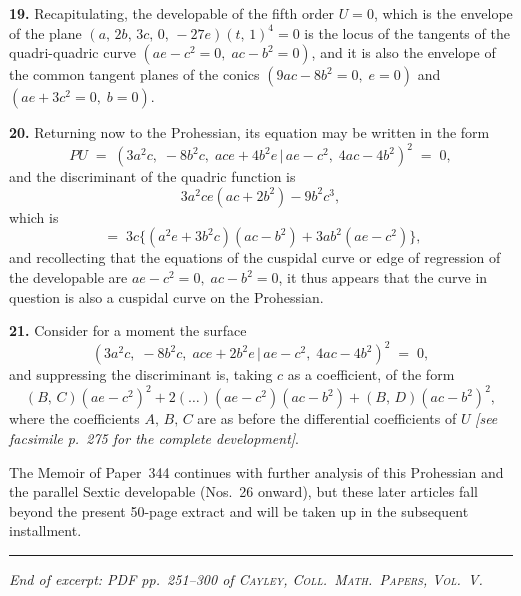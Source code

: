 \documentclass[11pt,a4paper]{article}
\providecommand{\mid}{\,|\,}
\begin{document}
\medskip

\textbf{19.} Recapitulating, the developable of the fifth order $U = 0$, which is the envelope of the plane $(a,\,2b,\,3c,\,0,\,-27e)(t,\,1)^4 = 0$ is the locus of the tangents of the quadri-quadric curve $(ae - c^2 = 0,\;ac - b^2 = 0)$, and it is also the envelope of the common tangent planes of the conics $(9ac - 8b^2 = 0,\;e = 0)$ and $(ae + 3c^2 = 0,\;b = 0)$.

\medskip

\textbf{20.} Returning now to the Prohessian, its equation may be written in the form
\[
PU \;=\; (3a^2 c,\;-8 b^2 c,\;ace + 4b^2 e\mid ae - c^2,\;4ac - 4b^2)^2 \;=\; 0,
\]
and the discriminant of the quadric function is
\[
3 a^2 ce(ac + 2b^2) - 9 b^2 c^3,
\]
which is
\[
\;=\; 3c\bigl\{(a^2 e + 3b^2 c)(ac - b^2) + 3 ab^2(ae - c^2)\bigr\},
\]
and recollecting that the equations of the cuspidal curve or edge of regression of the developable are $ae - c^2 = 0,\;ac - b^2 = 0$, it thus appears that the curve in question is also a cuspidal curve on the Prohessian.

\medskip

\textbf{21.} Consider for a moment the surface
\[
(3 a^2 c,\;-8 b^2 c,\;ace + 2b^2 e\mid ae - c^2,\;4ac - 4b^2)^2 \;=\; 0,
\]
and suppressing the discriminant is, taking $c$ as a coefficient, of the form
\[
(B,\,C)(ae - c^2)^2 + 2(\ldots)(ae - c^2)(ac - b^2) + (B,\,D)(ac - b^2)^2,
\]
where the coefficients $A,\,B,\,C$ are as before the differential coefficients of $U$ \textit{[see facsimile p.~275 for the complete development]}.

\medskip

The Memoir of Paper~344 continues with further analysis of this Prohessian and the parallel Sextic developable (Nos.~26 onward), but these later articles fall beyond the present 50-page extract and will be taken up in the subsequent installment.

\bigskip
\noindent\rule{\textwidth}{0.4pt}
\bigskip

\begin{center}
\textit{End of excerpt: PDF pp.~251--300 of \textsc{Cayley, Coll.\ Math.\ Papers, Vol.~V}.}
\end{center}
\end{document}
